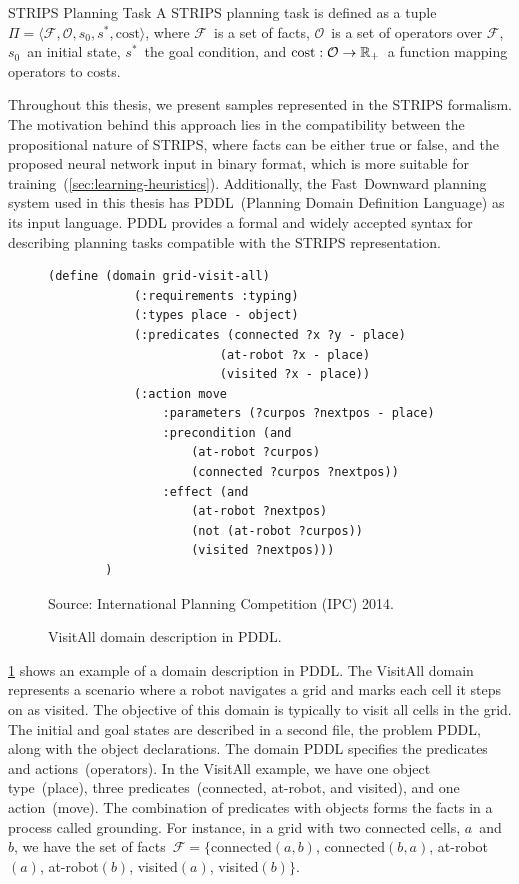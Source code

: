 \begin{definition}{STRIPS Planning Task}
    \label{def:strips}
    A STRIPS planning task is defined as a tuple~$\Pi=\langle\mathcal{F},\mathcal{O},s_0,s^*, \text{cost}\rangle$, where $\mathcal{F}$~is a set of facts, $\mathcal{O}$~is a set of operators over $\mathcal{F}$, $s_0$~an initial state, $s^*$~the goal condition, and $\text{cost}:\mathcal{O}\rightarrow\mathbb{R}_{+}$~a function mapping operators to costs.
\end{definition}

Throughout this thesis, we present samples represented in the STRIPS formalism. The motivation behind this approach lies in the compatibility between the propositional nature of STRIPS, where facts can be either true or false, and the proposed neural network input in binary format, which is more suitable for training~(\cref{sec:learning-heuristics}). Additionally, the Fast~Downward planning system used in this thesis has PDDL~(Planning Domain Definition Language) as its input language. PDDL provides a formal and widely accepted syntax for describing planning tasks compatible with the STRIPS representation.

\begin{figure}[tb]
    \caption{VisitAll domain description in PDDL.}
    \label{fig:pddl}
    \centering
    \begin{lstlisting}[basicstyle=\ttfamily]
        (define (domain grid-visit-all)
            (:requirements :typing)
            (:types place - object)
            (:predicates (connected ?x ?y - place)
                        (at-robot ?x - place)
                        (visited ?x - place))
            (:action move
                :parameters (?curpos ?nextpos - place)
                :precondition (and
                    (at-robot ?curpos)
                    (connected ?curpos ?nextpos))
                :effect (and 
                    (at-robot ?nextpos)
                    (not (at-robot ?curpos))
                    (visited ?nextpos)))
        )
    \end{lstlisting}
    Source: International Planning Competition (IPC) 2014.
\end{figure}

\cref{fig:pddl} shows an example of a domain description in PDDL. The VisitAll domain represents a scenario where a robot navigates a grid and marks each cell it steps on as visited. The objective of this domain is typically to visit all cells in the grid. The initial and goal states are described in a second file, the problem PDDL, along with the object declarations. The domain PDDL specifies the predicates and actions~(operators). In the VisitAll example, we have one object type~(place), three predicates~(connected, at-robot, and visited), and one action~(move). The combination of predicates with objects forms the facts in a process called grounding. For instance, in a grid with two connected cells, $a$~and~$b$, we have the set of facts~$\mathcal{F}=\{$connected$(a,b)$, \mbox{connected$(b,a)$}, \mbox{at-robot$(a)$}, \mbox{at-robot$(b)$}, \mbox{visited$(a)$}, visited$(b)\}$.


